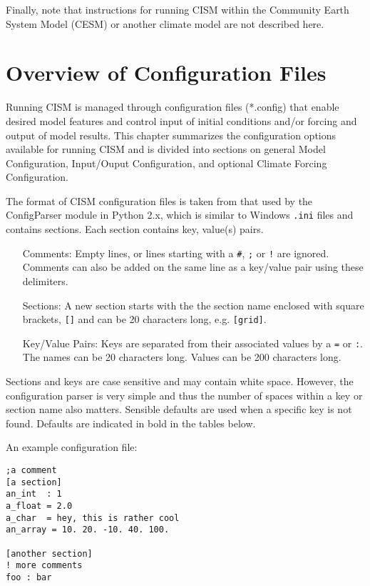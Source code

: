 Finally, note that instructions for running CISM within the Community Earth System Model (CESM)
or another climate model are not described here.



\section{Overview of Configuration Files}

Running CISM is managed through configuration files (*.config) that enable 
desired model features and control input of initial conditions and/or forcing 
and output of model results.  This chapter summarizes the configuration options 
available for running CISM and is divided into sections on general Model Configuration, 
Input/Ouput Configuration, and optional Climate Forcing Configuration.

The format of CISM configuration files is taken from that used by the 
ConfigParser module in Python 2.x, which is similar to Windows \texttt{.ini} files 
and contains sections. Each section contains key, value(s) pairs.

\begin{itemize}
\item[Comments:] Empty lines, or lines starting with a \texttt{\#}, \texttt{;} or \texttt{!} are ignored.  Comments can also be added on the same line as a key/value pair using these delimiters.
\item[Sections:] A new section starts with the the section name enclosed with square brackets, \texttt{[]} and can be 20 characters long, e.g. \texttt{[grid]}.
\item[Key/Value Pairs:] Keys are separated from their associated values by a \texttt{=} or \texttt{:}. The names can be 20 characters long. Values can be 200 characters long.
\end{itemize}

Sections and keys are case sensitive and may contain white space. 
However, the configuration parser is very simple and thus the number of spaces 
within a key or section name also matters. Sensible defaults are used when 
a specific key is not found.  Defaults are indicated in bold in the tables below.

An example configuration file:
\begin{verbatim}
;a comment
[a section]
an_int  : 1
a_float = 2.0
a_char  = hey, this is rather cool
an_array = 10. 20. -10. 40. 100.

[another section]
! more comments
foo : bar
\end{verbatim}



